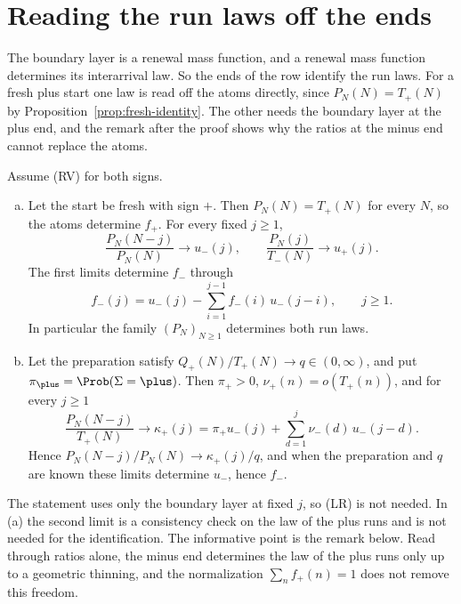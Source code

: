 \section{Reading the run laws off the ends}\label{sec:inverse}

The boundary layer is a renewal mass function, and a renewal mass function
determines its interarrival law. So the ends of the row identify the run laws.
For a fresh plus start one law is read off the atoms directly, since
$P_N(N)=T_\plus(N)$ by Proposition~\ref{prop:fresh-identity}. The other needs the
boundary layer at the plus end, and the remark after the proof shows why the
ratios at the minus end cannot replace the atoms.

\begin{proposition}\label{thm:inverse}
Assume (RV) for both signs.
\begin{enumerate}[(a)]
\item Let the start be fresh with sign $\plus$. Then $P_N(N)=T_\plus(N)$ for every
$N$, so the atoms determine $f_\plus$. For every fixed $j\ge1$,
\[
 \frac{P_N(N-j)}{P_N(N)}\to u_\minus(j),\qquad
 \frac{P_N(j)}{T_\minus(N)}\to u_\plus(j).
\]
The first limits determine $f_\minus$ through
\begin{equation}\label{eq:renewal-inverse}
 f_\minus(j)=u_\minus(j)-\sum_{i=1}^{j-1}f_\minus(i)\,u_\minus(j-i),\qquad j\ge1.
\end{equation}
In particular the family $(P_N)_{N\ge1}$ determines both run laws.
\item Let the preparation satisfy $Q_\plus(N)/T_\plus(N)\to q\in(0,\infty)$, and put
$\pi_\plus=\Prob(\Sigma=\plus)$. Then $\pi_\plus>0$, $\nu_\plus(n)=o(T_\plus(n))$,
and for every $j\ge1$
\[
 \frac{P_N(N-j)}{T_\plus(N)}\to\kappa_\plus(j)
 =\pi_\plus u_\minus(j)+\sum_{d=1}^{j}\nu_\minus(d)\,u_\minus(j-d).
\]
Hence $P_N(N-j)/P_N(N)\to\kappa_\plus(j)/q$, and when the preparation and
$q$ are known these limits determine $u_\minus$, hence $f_\minus$.
\end{enumerate}
\end{proposition}

The statement uses only the boundary layer at fixed $j$, so (LR) is not needed.
In (a) the second limit is a consistency check on the law of the plus runs and
is not needed for the identification. The informative point is the remark
below. Read through ratios alone, the minus end determines the law of the plus
runs only up to a geometric thinning, and the normalization $\sum_nf_\plus(n)=1$
does not remove this freedom.

